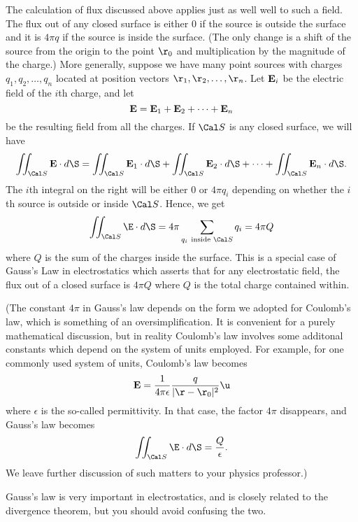 The calculation of flux discussed above  applies just as well
 well to such a field.  The flux out of any closed
surface is either $0$ if the source is outside the surface
and it is $4\pi q$ if the source is inside the surface.  (The
only change is a shift of the source from the origin to the
point $\r_0$ and multiplication by the magnitude of the charge.)
More generally, suppose we have many point sources with
charges $q_1, q_2,\dots, q_n$ located at
position vectors $\r_1, \r_2, \dots, \r_n$.  Let $\bold E_i$ be
the electric field of the $i$th charge, and let 
$$
\bold E = \bold E_1 + \bold E_2 + \dots + \bold E_n
$$
be the resulting field from all the charges.  If  $\Cal S$
is any closed surface, we will have
$$
\iint_{\Cal S} \bold E\cdot d\S =  
\iint_{\Cal S} \bold E_1\cdot d\S +  
\iint_{\Cal S} \bold E_2\cdot d\S +  
\dots +
\iint_{\Cal S} \bold E_n\cdot d\S.   
$$
The $i$th integral on the right will be either $0$ or $4\pi q_i$
depending on whether the $i$th source is outside or inside $\Cal S$.
Hence, we get
$$
\iint_{\Cal S}\E\cdot d\S
 = 4\pi \sum_{q_i\ \text{inside }\Cal S} q_i = 4\pi Q
$$
where $Q$ is the sum of the charges inside the surface.  This
is a special case of Gauss's Law in electrostatics which asserts
that for any electrostatic field, the flux out of
a closed surface is  $4\pi Q$ where $Q$ is the total charge contained within.
%

(The constant $4\pi$
in Gauss's law depends on the form we adopted for
 Coulomb's law, which
is something of an oversimplification.  It is
 convenient for a purely mathematical discussion, but
in reality Coulomb's law involves some additonal constants which depend
on the system of units employed.
 For example, for one commonly used system of units,
  Coulomb's law becomes 
 $$
\bold E = \frac 1{4\pi\epsilon}\frac q{|\r - \r_0|^2} \u
$$
where $\epsilon$ is the so-called permittivity.  In that case, the
factor $4\pi$ disappears, and Gauss's law becomes
$$
\iint_{\Cal S}\E\cdot d\S = \frac Q\epsilon.
$$
We leave further discussion of such matters to your physics
professor.)

Gauss's law is very important in electrostatics, and is closely
related to the divergence theorem, but you should avoid confusing
the two.


